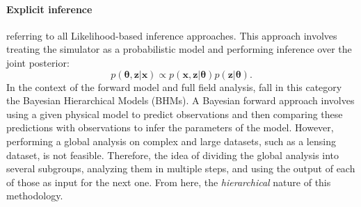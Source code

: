 \documentclass{aa}
\begin{document}
\paragraph{\textbf{Explicit inference}} referring to all Likelihood-based inference approaches.  
This approach involves treating the simulator as a probabilistic model and performing inference over the joint posterior:
\begin{equation}
        p(\bm{\theta},\bm{z}|\bm{x})\propto  p(\bm{x},\bm{z}|\bm{\theta}) p(\bm{z}|\bm{\theta}).
\end{equation}
In the context of the forward model and full field analysis, fall in this category the Bayesian Hierarchical Models (BHMs).
A Bayesian forward approach involves using a given physical model to predict observations and then comparing these predictions with observations to infer the parameters of the model.
However, performing a global analysis on complex and large datasets, such as a lensing dataset, is not feasible. Therefore, the idea of dividing the global analysis into several subgroups, analyzing them in multiple steps, and using the output of each of those as input for the next one. From here, the \textit{hierarchical} nature of this methodology.
\end{document}
